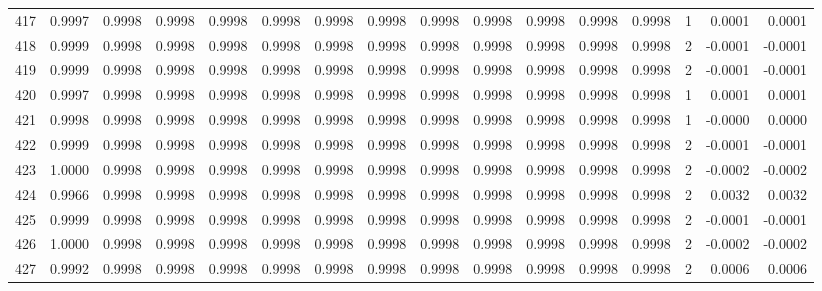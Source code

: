 \begin{tabular}{lrrrrrrrrrrrrrrr}
417 &      0.9997 &  0.9998 &  0.9998 &  0.9998 &  0.9998 &  0.9998 &  0.9998 &  0.9998 &  0.9998 &  0.9998 &   0.9998 &     0.9998 &      1 &                    0.0001 &                     0.0001 \\
418 &      0.9999 &  0.9998 &  0.9998 &  0.9998 &  0.9998 &  0.9998 &  0.9998 &  0.9998 &  0.9998 &  0.9998 &   0.9998 &     0.9998 &      2 &                   -0.0001 &                    -0.0001 \\
419 &      0.9999 &  0.9998 &  0.9998 &  0.9998 &  0.9998 &  0.9998 &  0.9998 &  0.9998 &  0.9998 &  0.9998 &   0.9998 &     0.9998 &      2 &                   -0.0001 &                    -0.0001 \\
420 &      0.9997 &  0.9998 &  0.9998 &  0.9998 &  0.9998 &  0.9998 &  0.9998 &  0.9998 &  0.9998 &  0.9998 &   0.9998 &     0.9998 &      1 &                    0.0001 &                     0.0001 \\
421 &      0.9998 &  0.9998 &  0.9998 &  0.9998 &  0.9998 &  0.9998 &  0.9998 &  0.9998 &  0.9998 &  0.9998 &   0.9998 &     0.9998 &      1 &                   -0.0000 &                     0.0000 \\
422 &      0.9999 &  0.9998 &  0.9998 &  0.9998 &  0.9998 &  0.9998 &  0.9998 &  0.9998 &  0.9998 &  0.9998 &   0.9998 &     0.9998 &      2 &                   -0.0001 &                    -0.0001 \\
423 &      1.0000 &  0.9998 &  0.9998 &  0.9998 &  0.9998 &  0.9998 &  0.9998 &  0.9998 &  0.9998 &  0.9998 &   0.9998 &     0.9998 &      2 &                   -0.0002 &                    -0.0002 \\
424 &      0.9966 &  0.9998 &  0.9998 &  0.9998 &  0.9998 &  0.9998 &  0.9998 &  0.9998 &  0.9998 &  0.9998 &   0.9998 &     0.9998 &      2 &                    0.0032 &                     0.0032 \\
425 &      0.9999 &  0.9998 &  0.9998 &  0.9998 &  0.9998 &  0.9998 &  0.9998 &  0.9998 &  0.9998 &  0.9998 &   0.9998 &     0.9998 &      2 &                   -0.0001 &                    -0.0001 \\
426 &      1.0000 &  0.9998 &  0.9998 &  0.9998 &  0.9998 &  0.9998 &  0.9998 &  0.9998 &  0.9998 &  0.9998 &   0.9998 &     0.9998 &      2 &                   -0.0002 &                    -0.0002 \\
427 &      0.9992 &  0.9998 &  0.9998 &  0.9998 &  0.9998 &  0.9998 &  0.9998 &  0.9998 &  0.9998 &  0.9998 &   0.9998 &     0.9998 &      2 &                    0.0006 &                     0.0006 \\

\end{tabular}
